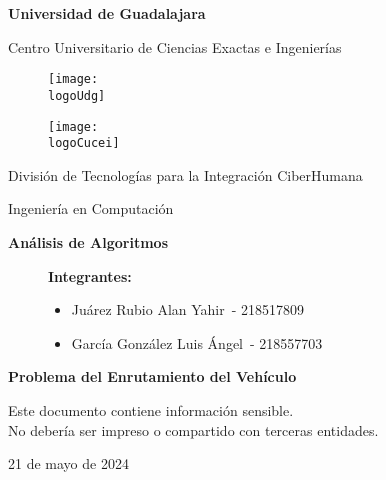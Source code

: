 \documentclass[10pt,twocolumn,letterpaper]{article}
\title{\fontsize{24}{28.8}\selectfont \theTitle}
\date{}
\newcommand{\logoUdg}{logo-udg.jpg}
\newcommand{\logoCucei}{logo-cucei.jpg}
\newcommand{\universidad}{Universidad de Guadalajara}
\newcommand{\cede}{Centro Universitario de Ciencias Exactas e Ingenierías}
\newcommand{\materia}{Análisis de Algoritmos}
\newcommand{\carrera}{Ingeniería en Computación}
\newcommand{\division}{División de Tecnologías para la Integración CiberHumana}
\newcommand{\theTitle}{Problema del Enrutamiento del Vehículo}
\newcommand{\startDate}{21 de mayo de 2024}
\newcommand{\theAuthor}{Juárez Rubio Alan Yahir}
\newcommand{\bAuthor}{García González Luis Ángel}
\newcommand{\theAuthorCode}{218517809}
\newcommand{\bAuthorCode}{218557703}
\newcommand{\nl}{\par\vspace{0.4cm}}
\begin{document}

\begin{titlepage}
	\centering
	{\huge\textbf{\universidad}}\par\vspace{0.6cm}
	{\LARGE{\cede}}\vfill
	
	\begin{figure}[h]
		\begin{minipage}[t]{0.45\textwidth}
			\centering
			\texttt{[image: \\logoUdg]}
		\end{minipage}
		\hfill
		\begin{minipage}[t]{0.45\textwidth}
			\centering
			\texttt{[image: \\logoCucei]}
		\end{minipage}
	\end{figure}\vfill
	
	\Large{
		\division\nl
		\carrera\nl
		\textbf{\materia}\nl
	}
	\begin{figure}[h]
		\centering
		\begin{minipage}[t]{0.75\textwidth}
			{\Large
				\textbf{Integrantes:}
				\begin{itemize}
					\item \theAuthor\ - \theAuthorCode
					\item \bAuthor\ - \bAuthorCode
				\end{itemize}
			}
		\end{minipage}
	\end{figure}\vfill
	{\LARGE{\textbf{\theTitle}}}\vfill
	
	\begin{tcolorbox}[colback=red!5!white, colframe=red!75!black]
		\centering
		Este documento contiene información sensible.\\
		No debería ser impreso o compartido con terceras entidades.
	\end{tcolorbox}\vfill

	{\large \startDate}\par
\end{titlepage}

\maketitle
\end{document}
